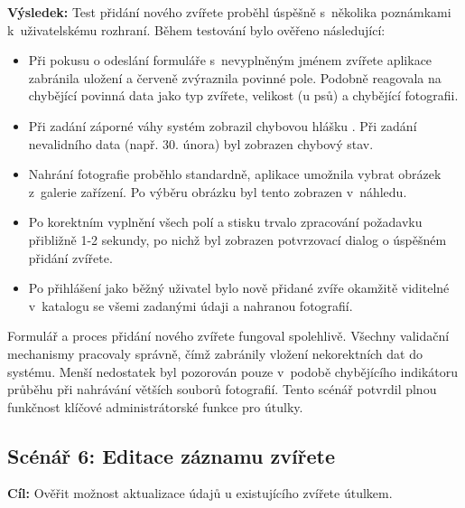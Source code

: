 \documentclass[czech, bp, kiv, he, iso690numb, pdf]{fasthesis}
\begin{document}
    \noindent \textbf{Výsledek:}
    Test přidání nového zvířete proběhl úspěšně s~několika poznámkami k~uživatelskému rozhraní. Během testování bylo ověřeno následující:

    \begin{itemize}
        \item Při pokusu o odeslání formuláře s~nevyplněným jménem zvířete aplikace zabránila uložení a červeně zvýraznila povinné pole. Podobně reagovala na chybějící povinná data jako typ zvířete, velikost (u psů) a chybějící fotografii.

        \item Při zadání záporné váhy systém zobrazil chybovou hlášku . Při zadání nevalidního data (např. 30. února) byl zobrazen chybový stav.

        \item Nahrání fotografie proběhlo standardně, aplikace umožnila vybrat obrázek z~galerie zařízení. Po výběru obrázku byl tento zobrazen v~náhledu.

        \item Po korektním vyplnění všech polí a stisku  trvalo zpracování požadavku přibližně 1-2 sekundy, po nichž byl zobrazen potvrzovací dialog o úspěšném přidání zvířete.

        \item Po přihlášení jako běžný uživatel bylo nově přidané zvíře  okamžitě viditelné v~katalogu se všemi zadanými údaji a nahranou fotografií.
    \end{itemize}

    Formulář a proces přidání nového zvířete fungoval spolehlivě. Všechny validační mechanismy pracovaly správně, čímž zabránily vložení nekorektních dat do systému. Menší nedostatek byl pozorován pouze v~podobě chybějícího indikátoru průběhu při nahrávání větších souborů fotografií. Tento scénář potvrdil plnou funkčnost klíčové administrátorské funkce pro útulky.



    \subsection*{Scénář 6: Editace záznamu zvířete}

    \textbf{Cíl:} Ověřit možnost aktualizace údajů u existujícího zvířete útulkem.\\
\end{document}
